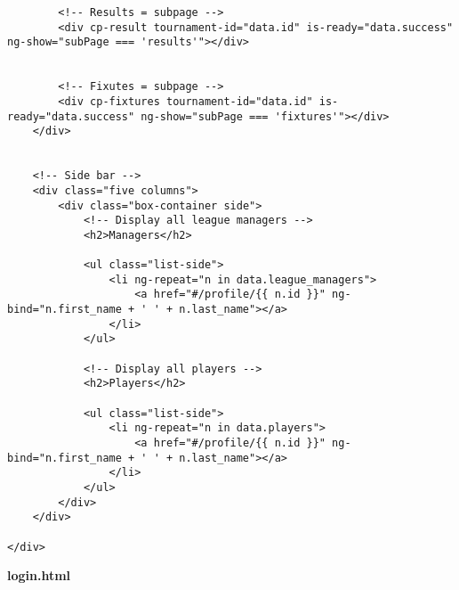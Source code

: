 {\begin{lstlisting}
		<!-- Results = subpage -->
		<div cp-result tournament-id="data.id" is-ready="data.success" ng-show="subPage === 'results'"></div>

		
		<!-- Fixutes = subpage -->
		<div cp-fixtures tournament-id="data.id" is-ready="data.success" ng-show="subPage === 'fixtures'"></div>
	</div>


	<!-- Side bar -->
	<div class="five columns">
		<div class="box-container side">
			<!-- Display all league managers -->
			<h2>Managers</h2>

			<ul class="list-side">
				<li ng-repeat="n in data.league_managers">
					<a href="#/profile/{{ n.id }}" ng-bind="n.first_name + ' ' + n.last_name"></a>
				</li>
			</ul>
			
			<!-- Display all players -->
			<h2>Players</h2>

			<ul class="list-side">
				<li ng-repeat="n in data.players">
					<a href="#/profile/{{ n.id }}" ng-bind="n.first_name + ' ' + n.last_name"></a>
				</li>
			</ul>
		</div>
	</div>

</div>\end{lstlisting}
}
\textbf{login.html}\label{login.html}

